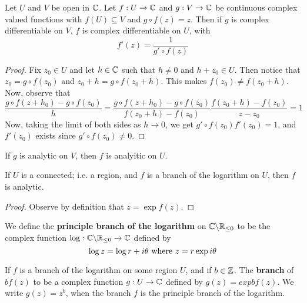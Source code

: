 \begin{lemma}\label{3.2.7}
    Let $U$ and  $V$ be open in  $\mathbb{C}$. Let  $f:U \xrightarrow{} \mathbb{C}$ and $g:V
    \xrightarrow{} \mathbb{C}$ be continuous complex valued functions with $f(U)
    \subseteq V$ and $g \circ f(z)=z$. Then if $g$ is complex differentiable on
    $V$, $f$ is complex differentiable on  $U$, with
    \begin{equation*}
        f'(z)=\frac{1}{g' \circ f(z)}
    \end{equation*}
\end{lemma}
\begin{proof}
    Fix $z_0 \in U$ and let $h \in \mathbb{C}$ such that  $h \neq 0$ and  $h+z_0 \in U$.
    Then notice that $z_0=g \circ f(z_0)$ and $z_0+h=g \circ f(z_0+h)$. This
    makes $f(z_0) \neq f(z_0+h)$. Now, observe that
    \begin{equation*}
        \frac{g \circ f(z+h_0)-g \circ f(z_0)}{h}=
        \frac{g \circ f(z+h_0)-g \circ
        f(z_0)}{f(z_0+h)-f(z_0)}\frac{f(z_0+h)-f(z_0)}{z-z_0}=1
    \end{equation*}
    Now, taking the limit of both sides as $h \xrightarrow{} 0$, we get $g'
    \circ f(z_0)f'(z_0)=1$, and $f'(z_0)$ exists since $g' \circ f(z_0) \neq 0$.
\end{proof}
\begin{corollary}
    If $g$ is analytic on  $V$, then  $f$ is analyitic on  $U$.
\end{corollary}
\begin{corollary}
    If $U$ is a connected; i.e. a region, and $f$ is a branch of the logarithm
    on  $U$, then  $f$ is analytic.
\end{corollary}
\begin{proof}
    Observe by definition that $z=\exp{f(z)}$.
\end{proof}

\begin{definition}
    We define the \textbf{principle branch of the logarithm} on
    $\mathbb{C} \backslash \mathbb{R}_{\leq 0}$ to be the complex function
    $\log:\mathbb{C} \backslash \mathbb{R}_{\leq 0} \xrightarrow{} \mathbb{C}$ defined by
    \begin{equation*}
        \log{z}=\log{r}+i\theta \text{ where }z=r\exp{i\theta}
    \end{equation*}
\end{definition}

\begin{definition}
    If $f$ is a branch of the logarithm on some region  $U$, and if  $b \in \mathbb{Z}$.
    The \textbf{branch} of $bf(z)$ to be a complex function $g:U \xrightarrow{}
    \mathbb{C}$ defined by $g(z)=exp{bf(z)}$. We write $g(z)=z^b$, when the branch $f$
    is the principle branch of the logarithm.
\end{definition}

